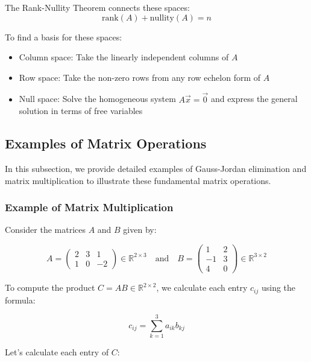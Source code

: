 The Rank-Nullity Theorem connects these spaces:
\begin{equation*}
\text{rank}(A) + \text{nullity}(A) = n
\end{equation*}

To find a basis for these spaces:
\begin{itemize}[label=\(-\)]
    \item Column space: Take the linearly independent columns of \(A\)
    \item Row space: Take the non-zero rows from any row echelon form of \(A\)
    \item Null space: Solve the homogeneous system \(A\vec{x} = \vec{0}\) and express the general solution in terms of free variables
\end{itemize}
\subsection{Examples of Matrix Operations}

In this subsection, we provide detailed examples of Gauss-Jordan elimination and matrix multiplication to illustrate these fundamental matrix operations.

\subsubsection{Example of Matrix Multiplication}

Consider the matrices \(A\) and \(B\) given by:

\begin{equation*}
A = 
\begin{pmatrix}
2 & 3 & 1 \\
1 & 0 & -2
\end{pmatrix} \in \mathbb{R}^{2 \times 3}
\quad \text{and} \quad
B = 
\begin{pmatrix}
1 & 2 \\
-1 & 3 \\
4 & 0
\end{pmatrix} \in \mathbb{R}^{3 \times 2}
\end{equation*}

To compute the product \(C = AB \in \mathbb{R}^{2 \times 2}\), we calculate each entry \(c_{ij}\) using the formula:

\begin{equation*}
c_{ij} = \sum_{k=1}^{3} a_{ik} b_{kj}
\end{equation*}

Let's calculate each entry of \(C\):

